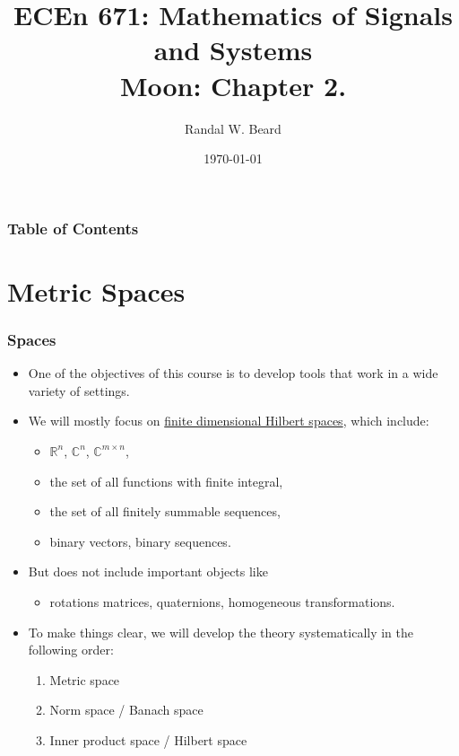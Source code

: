\documentclass{beamer}
\title{ECEn 671: Mathematics of Signals and Systems \\ 
Moon: Chapter 2.}
\author{Randal W. Beard}
\institute{Brigham Young University}
\date{\today}
\begin{document}
\begin{frame}
	\titlepage
\end{frame}

\begin{frame}[t]
\frametitle{Table of Contents}
\tableofcontents
\end{frame}

\section{Metric Spaces}
\frame{\sectionpage}

\begin{frame}\frametitle{Spaces}

\begin{itemize}
\item One of the objectives of this course is to develop tools that work in a wide variety of settings.  
\item We will mostly focus on \underline{finite dimensional Hilbert spaces}, which include:
	\begin{itemize}
		\item $\mathbb{R}^n$, $\mathbb{C}^n$, $\mathbb{C}^{m\times n}$,
		\item the set of all functions with finite integral,
		\item the set of all finitely summable sequences,
		\item binary vectors, binary sequences.
	\end{itemize}
\item But does not include important objects like 
	\begin{itemize}
	\item rotations matrices, quaternions, homogeneous transformations.	
	\end{itemize}
\item To make things clear, we will develop the theory systematically in the following order:
	\begin{enumerate}
		\item Metric space
		\item Norm space / Banach space
		\item Inner product space / Hilbert space
	\end{enumerate}
\end{itemize}
\end{frame}
\end{document}
